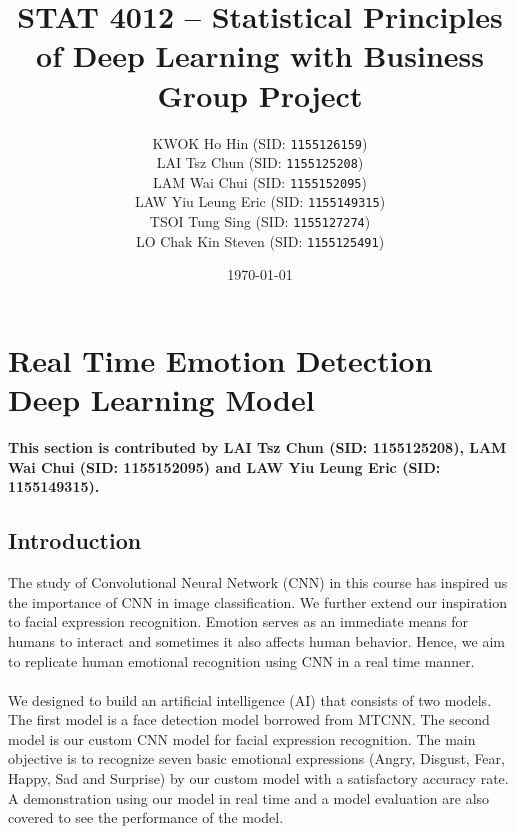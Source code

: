 \documentclass[11pt,a4paper]{article}
\begin{document}
    
    \thispagestyle{empty}
    \title{\textsc{STAT 4012} -- Statistical Principles of Deep Learning with Business \\ Group Project}
    \author{
        KWOK Ho Hin (SID: \texttt{1155126159}) \\
        LAI Tsz Chun (SID: \texttt{1155125208}) \\
        LAM Wai Chui (SID: \texttt{1155152095}) \\
        LAW Yiu Leung Eric (SID: \texttt{1155149315}) \\
        TSOI Tung Sing (SID: \texttt{1155127274}) \\
        LO Chak Kin Steven (SID: \texttt{1155125491})
    }
    \date{\today}
    \maketitle
    
    \tableofcontents
    \thispagestyle{empty}
    \newpage
    
    \setcounter{page}{1}
    
    \section{Real Time Emotion Detection Deep Learning Model}
    \textbf{This section is contributed by LAI Tsz Chun (SID: 1155125208), LAM Wai Chui (SID: 1155152095) and LAW Yiu Leung Eric (SID: 1155149315).}
    
    \subsection{Introduction}
    The study of Convolutional Neural Network (CNN) in this course has inspired us the importance of CNN in image classification. We further extend our inspiration to facial expression recognition. Emotion serves as an immediate means for humans to interact and sometimes it also affects human behavior. Hence, we aim to replicate human emotional recognition using CNN in a real time manner. \\
    \\
    We designed to build an artificial intelligence (AI) that consists of two models. The first model is a face detection model borrowed from MTCNN. The second model is our custom CNN model for facial expression recognition. The main objective is to recognize seven basic emotional expressions (Angry, Disgust, Fear, Happy, Sad and Surprise) by our custom model with a satisfactory accuracy rate. A demonstration using our model in real time and a model evaluation are also covered to see the performance of the model.
\end{document}
